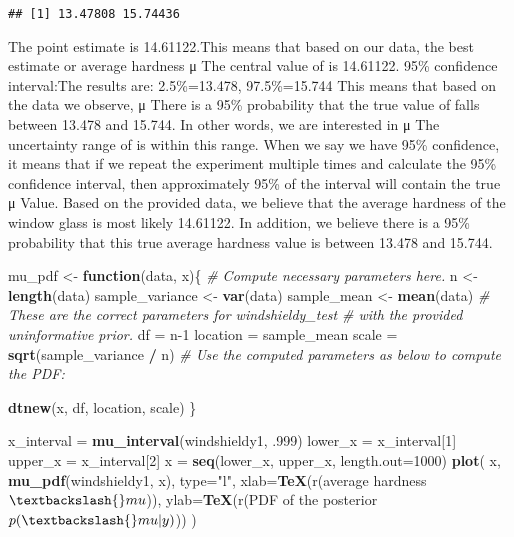 \documentclass[
]{article}
\newenvironment{Shaded}{\begin{snugshade}}{\end{snugshade}}
\newcommand{\AttributeTok}[1]{\textcolor[rgb]{0.13,0.29,0.53}{#1}}
\newcommand{\CommentTok}[1]{\textcolor[rgb]{0.56,0.35,0.01}{\textit{#1}}}
\newcommand{\ControlFlowTok}[1]{\textcolor[rgb]{0.13,0.29,0.53}{\textbf{#1}}}
\newcommand{\DecValTok}[1]{\textcolor[rgb]{0.00,0.00,0.81}{#1}}
\newcommand{\FunctionTok}[1]{\textcolor[rgb]{0.13,0.29,0.53}{\textbf{#1}}}
\newcommand{\NormalTok}[1]{#1}
\newcommand{\OtherTok}[1]{\textcolor[rgb]{0.56,0.35,0.01}{#1}}
\newcommand{\SpecialCharTok}[1]{\textcolor[rgb]{0.81,0.36,0.00}{\textbf{#1}}}
\newcommand{\StringTok}[1]{\textcolor[rgb]{0.31,0.60,0.02}{#1}}
\begin{document}
\begin{verbatim}
## [1] 13.47808 15.74436
\end{verbatim}

The point estimate is 14.61122.This means that based on our data, the
best estimate or average hardness μ The central value of is 14.61122.
95\% confidence interval:The results are: 2.5\%=13.478, 97.5\%=15.744
This means that based on the data we observe, μ There is a 95\%
probability that the true value of falls between 13.478 and 15.744. In
other words, we are interested in μ The uncertainty range of is within
this range. When we say we have 95\% confidence, it means that if we
repeat the experiment multiple times and calculate the 95\% confidence
interval, then approximately 95\% of the interval will contain the true
μ Value. Based on the provided data, we believe that the average
hardness of the window glass is most likely 14.61122. In addition, we
believe there is a 95\% probability that this true average hardness
value is between 13.478 and 15.744.

\begin{Shaded}
\begin{Highlighting}[]
\NormalTok{mu\_pdf }\OtherTok{\textless{}{-}} \ControlFlowTok{function}\NormalTok{(data, x)\{}
    \CommentTok{\# Compute necessary parameters here.}
\NormalTok{    n }\OtherTok{\textless{}{-}} \FunctionTok{length}\NormalTok{(data)}
\NormalTok{    sample\_variance }\OtherTok{\textless{}{-}} \FunctionTok{var}\NormalTok{(data)}
\NormalTok{    sample\_mean }\OtherTok{\textless{}{-}} \FunctionTok{mean}\NormalTok{(data)}
    \CommentTok{\# These are the correct parameters for \textasciigrave{}windshieldy\_test\textasciigrave{} }
    \CommentTok{\# with the provided uninformative prior.}
\NormalTok{    df }\OtherTok{=}\NormalTok{ n}\DecValTok{{-}1}
\NormalTok{    location }\OtherTok{=}\NormalTok{ sample\_mean}
\NormalTok{    scale }\OtherTok{=} \FunctionTok{sqrt}\NormalTok{(sample\_variance }\SpecialCharTok{/}\NormalTok{ n)}
    \CommentTok{\# Use the computed parameters as below to compute the PDF:}
     
    \FunctionTok{dtnew}\NormalTok{(x, df, location, scale)}
\NormalTok{\}}

\NormalTok{x\_interval }\OtherTok{=} \FunctionTok{mu\_interval}\NormalTok{(windshieldy1, .}\DecValTok{999}\NormalTok{)}
\NormalTok{lower\_x }\OtherTok{=}\NormalTok{ x\_interval[}\DecValTok{1}\NormalTok{]}
\NormalTok{upper\_x }\OtherTok{=}\NormalTok{ x\_interval[}\DecValTok{2}\NormalTok{]}
\NormalTok{x }\OtherTok{=} \FunctionTok{seq}\NormalTok{(lower\_x, upper\_x, }\AttributeTok{length.out=}\DecValTok{1000}\NormalTok{)}
\FunctionTok{plot}\NormalTok{(}
\NormalTok{    x, }\FunctionTok{mu\_pdf}\NormalTok{(windshieldy1, x), }\AttributeTok{type=}\StringTok{"l"}\NormalTok{, }
    \AttributeTok{xlab=}\FunctionTok{TeX}\NormalTok{(r}\StringTok{\textquotesingle{}(average hardness $\textbackslash{}mu$)\textquotesingle{}}\NormalTok{), }
    \AttributeTok{ylab=}\FunctionTok{TeX}\NormalTok{(r}\StringTok{\textquotesingle{}(PDF of the posterior $p(\textbackslash{}mu|y)$)\textquotesingle{}}\NormalTok{)}
\NormalTok{)}
\end{Highlighting}
\end{Shaded}
\end{document}
